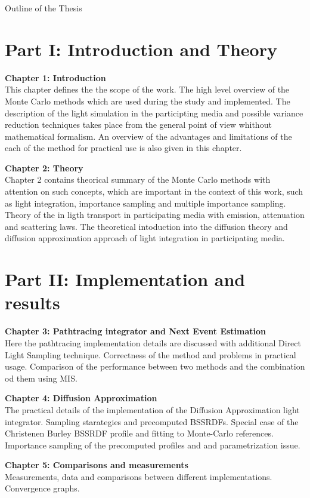 \newpage

{}

\begin{center}
	\huge{Outline of the Thesis}
\end{center}

\section*{Part I: Introduction and Theory}

\textbf{ Chapter 1: Introduction}\\
This chapter defines the the scope of the work. The high level
overview of the Monte Carlo methods which are used during the study and
implemented.
The description of the light simulation in the participting media and possible
variance reduction techniques takes place from the general point of view
whithout mathematical formalism. An overview of the advantages and limitations
of the each of the method for practical use is also given in this chapter.

\textbf{Chapter 2: Theory}\\
Chapter 2 contains theorical summary of the Monte Carlo methods with attention
on such concepts, which are important in the context of this work, such
as light integration, importance sampling and multiple importance sampling.
Theory of the in ligth transport in participating media with emission,
attenuation and scattering laws.
The theoretical intoduction into the diffusion theory and diffusion
approximation approach of light integration in participating media.

\section*{Part II: Implementation and results}

\textbf{ Chapter 3: Pathtracing integrator and Next Event Estimation}\\
Here the pathtracing implementation details are discussed with additional Direct
Light Sampling technique. Correctness of the method and problems in practical
usage. Comparison of the performance between two methods and the combination od
them using MIS.

\textbf{ Chapter 4: Diffusion Approximation}\\
The practical details of the implementation of the Diffusion Approximation
light integrator. Sampling starategies and precomputed BSSRDFs. Special case of
the Christenen Burley BSSRDF profile and fitting to Monte-Carlo references.
Importance sampling of the precomputed profiles and and parametrization issue.


\textbf{ Chapter 5: Comparisons and measurements}\\
Measurements, data and comparisons between different implementations.
Convergence graphs. 
